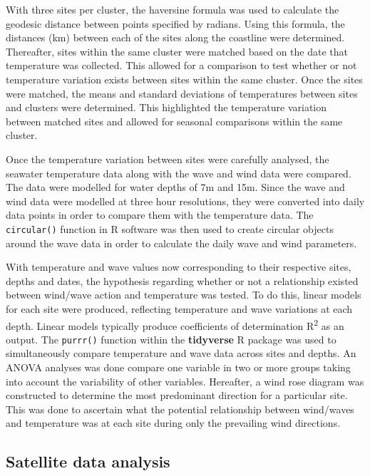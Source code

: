 \documentclass[12pt,a4paper,]{article}
\begin{document}
With three sites per cluster, the haversine formula was used to
calculate the geodesic distance between points specified by radians.
Using this formula, the distances (km) between each of the sites along
the coastline were determined. Thereafter, sites within the same cluster
were matched based on the date that temperature was collected. This
allowed for a comparison to test whether or not temperature variation
exists between sites within the same cluster. Once the sites were
matched, the means and standard deviations of temperatures between sites
and clusters were determined. This highlighted the temperature variation
between matched sites and allowed for seasonal comparisons within the
same cluster.

Once the temperature variation between sites were carefully analysed,
the seawater temperature data along with the wave and wind data were
compared. The data were modelled for water depths of 7m and 15m. Since
the wave and wind data were modelled at three hour resolutions, they
were converted into daily data points in order to compare them with the
temperature data. The \texttt{circular()} function in R software was
then used to create circular objects around the wave data in order to
calculate the daily wave and wind parameters.

With temperature and wave values now corresponding to their respective
sites, depths and dates, the hypothesis regarding whether or not a
relationship existed between wind/wave action and temperature was
tested. To do this, linear models for each site were produced,
reflecting temperature and wave variations at each depth. Linear models
typically produce coefficients of determination R\textsuperscript{2} as
an output. The \texttt{purrr()} function within the \textbf{tidyverse} R
package was used to simultaneously compare temperature and wave data
across sites and depths. An ANOVA analyses was done compare one variable
in two or more groups taking into account the variability of other
variables. Hereafter, a wind rose diagram was constructed to determine
the most predominant direction for a particular site. This was done to
ascertain what the potential relationship between wind/waves and
temperature was at each site during only the prevailing wind directions.

\hypertarget{satellite-data-analysis}{%
\subsection{Satellite data analysis}\label{satellite-data-analysis}}
\end{document}
